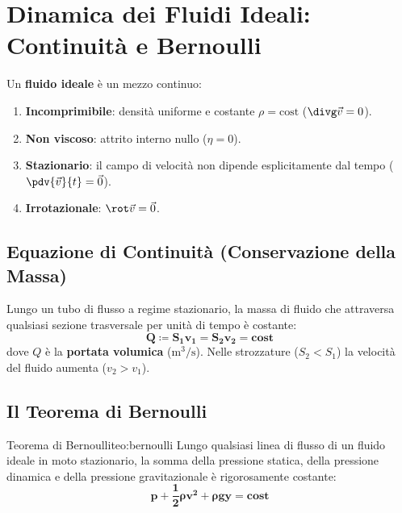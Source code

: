 \section{Dinamica dei Fluidi Ideali: Continuità e Bernoulli}
\label{sec:dinamica_fluidi}

Un \textbf{fluido ideale} è un mezzo continuo:
\begin{enumerate}
    \item \textbf{Incomprimibile}: densità uniforme e costante $\rho = \text{cost}$ ($\divg\vec{v} = 0$).
    \item \textbf{Non viscoso}: attrito interno nullo ($\eta = 0$).
    \item \textbf{Stazionario}: il campo di velocità non dipende esplicitamente dal tempo ($\pdv{\vec{v}}{t} = \vec{0}$).
    \item \textbf{Irrotazionale}: $\rot\vec{v} = \vec{0}$.
\end{enumerate}

\subsection{Equazione di Continuità (Conservazione della Massa)}
Lungo un tubo di flusso a regime stazionario, la massa di fluido che attraversa qualsiasi sezione trasversale per unità di tempo è costante:
\begin{equation}
    \mathbf{Q \coloneqq S_1 v_1 = S_2 v_2 = \text{cost}}
    \label{eq:continuita}
\end{equation}
dove $Q$ è la \textbf{portata volumica} ($\si{\metre\cubed\per\second}$). Nelle strozzature ($S_2 < S_1$) la velocità del fluido aumenta ($v_2 > v_1$).

\subsection{Il Teorema di Bernoulli}

\begin{teorema}{Teorema di Bernoulli}{teo:bernoulli}
Lungo qualsiasi linea di flusso di un fluido ideale in moto stazionario, la somma della pressione statica, della pressione dinamica e della pressione gravitazionale è rigorosamente costante:
\begin{equation}
    \mathbf{p + \frac{1}{2}\rho v^2 + \rho g y = \text{cost}}
    \label{eq:bernoulli}
\end{equation}
\end{teorema}

